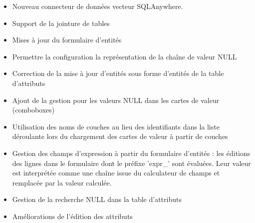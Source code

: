 \begin{itemize}[label=--]
\item Nouveau connecteur de données vecteur SQLAnywhere.
\item Support de la jointure de tables
\item Mises à jour du formulaire d'entités
\item Permettre la configuration la représentation de la chaîne de valeur NULL
\item Correction de la mise à jour d'entités sous forme d'entités de la table 
d'attributs
\item Ajout de la gestion pour les valeurs NULL dans les cartes de valeur (comboboxes)
\item Utilisation des noms de couches au lieu des identifiants dans la liste 
déroulante lors du chargement des cartes de valeur à partir de couches
\item Gestion des champs d'expression à partir du formulaire d'entités : les éditions 
des lignes dans le formulaire dont le préfixe 'expr\_' sont évaluées. Leur valeur 
est interprétée comme une chaîne issue du calculateur de champs et remplacée par 
la valeur calculée. 
\item Gestion de la recherche NULL dans la table d'attributs 
\item Améliorations de l'édition des attributs 

\end{itemize}
